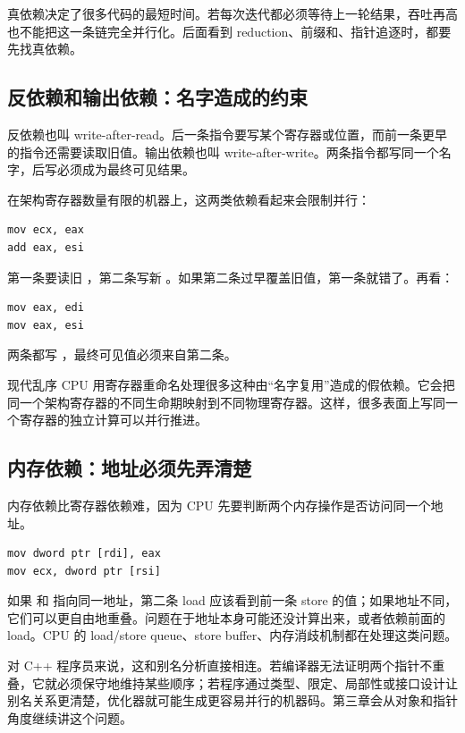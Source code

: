 真依赖决定了很多代码的最短时间。若每次迭代都必须等待上一轮结果，吞吐再高也不能把这一条链完全并行化。后面看到 reduction、前缀和、指针追逐时，都要先找真依赖。

\subsection{反依赖和输出依赖：名字造成的约束}

反依赖也叫 write-after-read。后一条指令要写某个寄存器或位置，而前一条更早的指令还需要读取旧值。输出依赖也叫 write-after-write。两条指令都写同一个名字，后写必须成为最终可见结果。

在架构寄存器数量有限的机器上，这两类依赖看起来会限制并行：

\begin{lstlisting}
mov ecx, eax
add eax, esi
\end{lstlisting}

第一条要读旧 ，第二条写新 。如果第二条过早覆盖旧值，第一条就错了。再看：

\begin{lstlisting}
mov eax, edi
mov eax, esi
\end{lstlisting}

两条都写 ，最终可见值必须来自第二条。

现代乱序 CPU 用寄存器重命名处理很多这种由“名字复用”造成的假依赖。它会把同一个架构寄存器的不同生命期映射到不同物理寄存器。这样，很多表面上写同一个寄存器的独立计算可以并行推进。

\subsection{内存依赖：地址必须先弄清楚}

内存依赖比寄存器依赖难，因为 CPU 先要判断两个内存操作是否访问同一个地址。

\begin{lstlisting}
mov dword ptr [rdi], eax
mov ecx, dword ptr [rsi]
\end{lstlisting}

如果  和  指向同一地址，第二条 load 应该看到前一条 store 的值；如果地址不同，它们可以更自由地重叠。问题在于地址本身可能还没计算出来，或者依赖前面的 load。CPU 的 load/store queue、store buffer、内存消歧机制都在处理这类问题。

对 C++ 程序员来说，这和别名分析直接相连。若编译器无法证明两个指针不重叠，它就必须保守地维持某些顺序；若程序通过类型、限定、局部性或接口设计让别名关系更清楚，优化器就可能生成更容易并行的机器码。第三章会从对象和指针角度继续讲这个问题。

